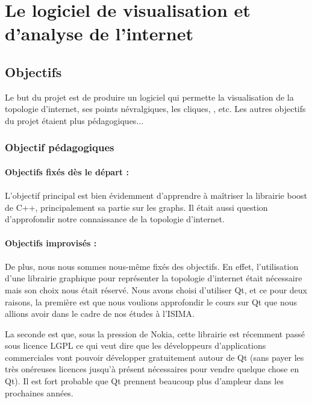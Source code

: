 \section{Le logiciel de visualisation et d'analyse de l'internet}
\subsection{Objectifs}

Le but du projet est de produire un logiciel qui permette la visualisation de la topologie d'internet, ses points névralgiques, les cliques, ,  etc. Les autres objectifs du projet étaient plus pédagogiques...

\subsubsection{Objectif pédagogiques}
\paragraph{Objectifs fixés dès le départ : } 
\paragraph{}L'objectif principal est bien évidemment d'apprendre à maîtriser la librairie boost de C++, principalement sa partie sur les graphs. Il était aussi question d'approfondir notre connaissance de la topologie d'internet.

\paragraph{Objectifs improvisés : }
\paragraph{} De plus, nous nous sommes nous-même fixés des objectifs. En effet, l'utilisation d'une librairie graphique pour représenter la topologie d'internet était nécessaire mais son choix nous était réservé. Nous avons choisi d'utiliser Qt, et ce pour deux raisons, la première est que nous voulions approfondir le cours sur Qt que nous allions avoir dans le cadre de nos études à l'ISIMA.

La seconde est que, sous la pression de Nokia, cette librairie est récemment passé sous licence LGPL ce qui veut dire que les développeurs d'applications commerciales vont pouvoir développer gratuitement autour de Qt (sans payer les très onéreuses licences jusqu'à présent nécessaires pour vendre quelque chose en Qt). Il est fort probable que Qt prennent beaucoup plus d'ampleur dans les prochaines années.

